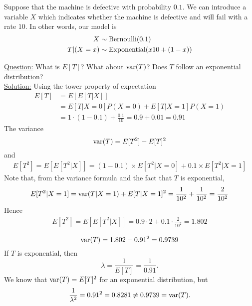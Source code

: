 \begin{example}

Suppose that the machine is defective with probability $0.1$. We can introduce a variable $X$ which indicates whether the machine is defective and will fail with a rate $10$. In other words, our model is 
\begin{align*}
X &\sim {\rm Bernoulli}(0.1)\\
T|(X=x) &\sim {\rm Exponential}(x10 + (1-x))
\end{align*}


\noindent
\underline{Question:} What is $E[T]$? What about ${\rm var}(T)$? Does $T$ follow an exponential distribution?\\ 


\noindent
\underline{Solution:} Using the tower property of expectation
\begin{align*}
E[T] &= E[E[T|X]] \\
&= E[T|X=0]P(X=0) + E[T|X=1]P(X=1) \\
&= 1 \cdot (1-0.1) + \frac{0.1}{10} = 0.9+0.01 = 0.91
\end{align*}
The variance 
\begin{equation*}
{\rm var}(T) = E[T^2]-E[T]^2
\end{equation*}
and 
\begin{align*}
E[T^2] = E[E[T^2|X]]  = (1-0.1)\times E[T^2|X=0] + 0.1 \times E[T^2|X=1] 
\end{align*}
Note that, from the variance formula and the fact that $T$ is exponential,
\begin{equation*}
E[T^2|X=1]  = {\rm var}(T|X=1) + E[T|X=1]^2 = \frac{1}{10^2}  + \frac{1}{10^2} = \frac{2}{10^2}
\end{equation*}
Hence 
\begin{align*}
E[T^2] = E[E[T^2|X]]  = 0.9 \cdot 2 + 0.1 \cdot \frac{2}{10^2} = 1.802
\end{align*}


\begin{equation*}
{\rm var}(T) =  1.802 -  0.91^2 = 0.9739
\end{equation*}
If $T$ is exponential, then 
\begin{equation*}
\lambda = \frac{1}{E[T]}=\frac{1}{0.91}.
\end{equation*}
We know that ${\rm var}(T) = E[T]^2$ for an exponential distribution, but 
\begin{equation*}
 \frac{1}{\lambda^2} = 0.91^2 = 0.8281 \ne  0.9739= {\rm var}(T). 
\end{equation*}


\end{example}




